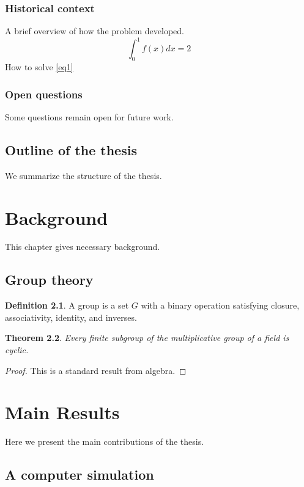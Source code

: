 \documentclass[12pt,reqno,oneside]{amsbook}
\newtheorem{theorem}{Theorem}[chapter]
\theoremstyle{definition}
\newtheorem{definition}[theorem]{Definition}
\begin{document}

\subsection{Historical context}
A brief overview of how the problem developed.
\begin{equation}\label{eq1}\int_0^1 f(x) dx = 2\end{equation}
How to solve \eqref{eq1}
\subsection{Open questions}
Some questions remain open for future work.

\section{Outline of the thesis}
We summarize the structure of the thesis.

\chapter{Background}
This chapter gives necessary background.

\section{Group theory}
\begin{definition}
A group is a set $G$ with a binary operation satisfying closure, associativity, identity, and inverses.
\end{definition}

\begin{theorem}
Every finite subgroup of the multiplicative group of a field is cyclic.
\end{theorem}

\begin{proof}
This is a standard result from algebra.
\end{proof}

\chapter{Main Results}
Here we present the main contributions of the thesis.

\section{A computer simulation}
\end{document}
